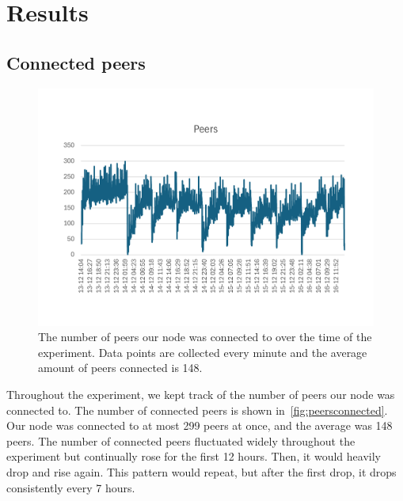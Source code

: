 \section{Results}\label{sec:results}

\subsection{Connected peers}\label{subsec:connected-peers}
\begin{figure}[!ht]
    \centering
    \includegraphics[scale = 0.5]{figures/conPeer2}
    \caption{The number of peers our node was connected to over the time of the experiment.
    Data points are collected every minute and the average amount of peers connected is 148.}
    \label{fig:peersconnected}
\end{figure}
Throughout the experiment, we kept track of the number of peers our node was connected to.
The number of connected peers is shown in~\autoref{fig:peersconnected}.
Our node was connected to at most 299 peers at once, and the average was 148 peers.
The number of connected peers fluctuated widely throughout the experiment but continually rose for the first 12 hours.
Then, it would heavily drop and rise again.
This pattern would repeat, but after the first drop, it drops consistently every 7 hours.

